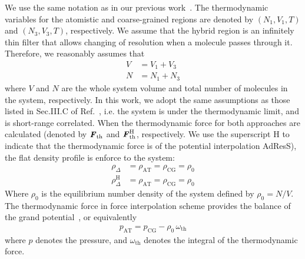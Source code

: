 \documentclass[a4paper,preprint,unsortedaddress]{revtex4-1}
\newcommand{\vect}[1]{\textbf{\textit{#1}}}
\newcommand{\AT}{{\textrm{{AT}}}}
\newcommand{\CG}{{\textrm{CG}}}
\newcommand{\HY}{{\Delta}}
\newcommand{\thf}{{\textrm{th}}}
\newcommand{\hadress}{{\textrm{H}}}
\begin{document}
We use the same notation as in our previous work~\cite{prx}.
The thermodynamic variables for the atomistic and coarse-grained regions
are denoted by $(N_1, V_1, T)$ and $(N_3, V_3, T)$, respectively.
We assume that the hybrid region is an infinitely thin filter that allows
changing of resolution when a molecule passes through it. Therefore, we
reasonably assumes that
\begin{align}
  V &= V_1 + V_3\\
  N &= N_1 + N_3
\end{align}
where $V$ and $N$ are the whole system volume and total number of
molecules in the system, respectively. In this work, we adopt the same
assumptions as those listed in Sec.III.C of Ref.~\cite{prx},
i.e. the system is under the thermodynamic limit, and is short-range
correlated. When the thermodynamic force for both approaches are calculated
(denoted by $\vect F_\thf$ and $\vect F^\hadress_\thf$, respectively.
We use the superscript H to indicate that the thermodynamic force is of the
potential interpolation AdResS),
the flat density profile is enforce to the system:
\begin{align}
  \rho_\HY &= \rho_\AT = \rho_\CG = \rho_0\\
  \rho_\HY^\hadress &= \rho_\AT = \rho_\CG = \rho_0
\end{align}
Where $\rho_0$ is the equilibrium number density of the system defined by $\rho_0 = N/V$.
The thermodynamic force in force interpolation scheme provides the
balance of the grand potential~\cite{prl12}, or equivalently
\begin{align}\label{eqn:peq}
  p_\AT = p_\CG - \rho_0 \,\omega_\thf 
\end{align}
where $p$ denotes the pressure, and $ \omega_\thf$ denotes the
integral of the thermodynamic force. \\
\end{document}

